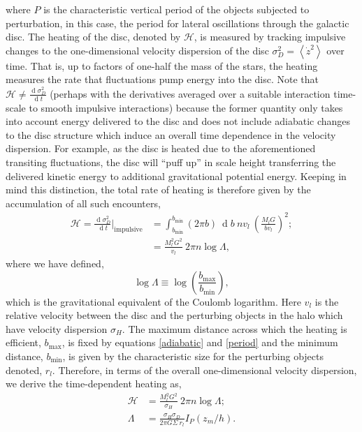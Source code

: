 \documentclass[usenatbib]{mnras}
\renewcommand{\d}[1]{\! \mathrm{d}#1 \:}
\newcommand{\deriv}[2]{\frac{\d{#1}}{\d{#2}}}
\renewcommand{\d}[1]{\ensuremath{\operatorname{d}\!{#1}}}
\begin{document}
where $P$ is the characteristic vertical period of the objects subjected to perturbation, in this case, the period for {\color{red} lateral} oscillations through the galactic disc. The heating of the disc, denoted by $\mathcal{H}$, is measured by tracking impulsive changes to the one-dimensional velocity dispersion of the disc $\sigma_D^2 = \left< \dot{z}^2 \right>$ over time. That is, up to factors of one-half the mass of the stars, the heating measures the rate that fluctuations pump energy into the disc. Note that $\mathcal{H} \neq \deriv{\sigma_D^2}{t}$ (perhaps with the derivatives averaged over a suitable interaction time-scale to smooth impulsive interactions) because the former quantity only takes into account energy delivered to the disc and does not include adiabatic changes to the disc structure which induce an overall time dependence in the velocity dispersion. For example, as the disc is heated due to the {\color{red} aforementioned} transiting fluctuations, the disc will ``puff up'' in scale height transferring the delivered kinetic energy to additional gravitational potential energy. Keeping in mind this distinction, the total rate of heating is therefore given by the accumulation of all such encounters,{ \color{red}
\begin{subequations}
\begin{align}
\mathcal{H} = \deriv{\sigma_D^2}{t} \bigg|_{\text{impulsive}} &= \int_{b_{\min}}^{b_{\min}} (2 \pi b) \: \d{b} \: n v_l \: \left( \frac{M_l G}{b v_l} \right)^2 ;
\\
& = \frac{M_l^2 G^2}{v_l} \: 2 \pi n \log{\Lambda},
\end{align}
\end{subequations}
}
where we have defined,
\begin{equation}
\log{\Lambda} \equiv \log{\left( \frac{b_{\text{max}}}{b_{\text{min}}} \right)},
\end{equation}
which is the gravitational equivalent of the Coulomb logarithm. { \color{red} Here $v_l$ is the relative velocity between the disc and the perturbing objects in the halo which have velocity dispersion $\sigma_H$. }
The maximum distance across which the heating is efficient, $b_{\max}$, is fixed by equations \eqref{adiabatic} and \eqref{period} and the minimum distance, $b_{\min}$, is given by the characteristic size for the perturbing objects denoted, $r_{l}$. 
Therefore, in terms of the overall one-dimensional velocity dispersion, we derive the time-dependent heating as,
\begin{subequations}
\begin{align}
\mathcal{H} &= \frac{M_l^2 G^2}{\sigma_H} \: 2 \pi n \log{\Lambda} ;
\\
\Lambda & = \frac{\sigma_H \sigma_D}{2 \pi G \Sigma \: r_l} I_P(z_m / h).
\end{align}
\end{subequations}
\end{document}

